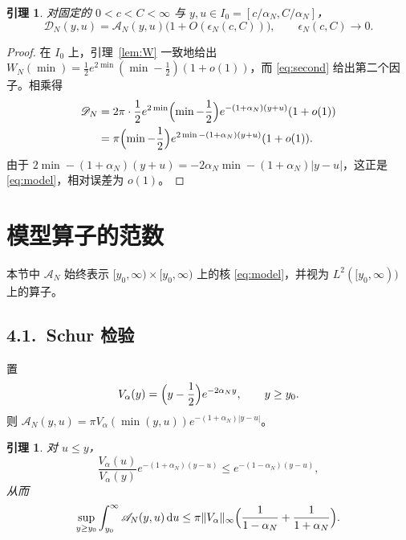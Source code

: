 \documentclass[12pt,a4paper]{amsart}
\numberwithin{equation}{section}
\theoremstyle{plain}
\newtheorem{lemma}[theorem]{引理}
\theoremstyle{definition}
\newcommand{\dd}{\,\mathrm{d}}
\begin{document}
\begin{lemma}\label{lem:close}
对固定的 $0<c<C<\infty$ 与 $y,u\in I_0=[c/\alpha_N,C/\alpha_N]$，
\begin{equation}\label{eq:close}
 \mathscr D_N(y,u)=\mathscr A_N(y,u)\bigl(1+O(\epsilon_N(c,C))\bigr),
 \qquad \epsilon_N(c,C)\longrightarrow0 .
\end{equation}
\end{lemma}

\begin{proof}
在 $I_0$ 上，引理~\ref{lem:W} 一致地给出
$W_N(\min)=\frac12e^{2\min}(\min-\frac12)(1+o(1))$，而 \eqref{eq:second}
给出第二个因子。相乘得
\[
 \begin{aligned}
 \mathscr D_N
 &=2\pi\cdot\frac12 e^{2\min}\Bigl(\min-\frac12\Bigr)e^{-(1+\alpha_N)(y+u)}(1+o(1))\\
 &=\pi\Bigl(\min-\frac12\Bigr)e^{2\min-(1+\alpha_N)(y+u)}(1+o(1)).
 \end{aligned}
\]
由于 $2\min-(1+\alpha_N)(y+u)=-2\alpha_N\min-(1+\alpha_N)|y-u|$，这正是
\eqref{eq:model}，相对误差为 $o(1)$。
\end{proof}

\section{模型算子的范数}\label{sec:model}

本节中 $\mathscr A_N$ 始终表示 $[y_0,\infty)\times[y_0,\infty)$ 上的核
\eqref{eq:model}，并视为 $L^2([y_0,\infty))$ 上的算子。

\subsection*{4.1.\ Schur 检验}

置
\begin{equation}\label{eq:Valpha}
 V_\alpha(y)=\Bigl(y-\frac12\Bigr)e^{-2\alpha_Ny},\qquad y\ge y_0 .
\end{equation}
则 $\mathscr A_N(y,u)=\pi V_\alpha(\min(y,u))e^{-(1+\alpha_N)|y-u|}$。

\begin{lemma}\label{lem:schur}
对 $u\le y$，
\begin{equation}\label{eq:ratio}
 \frac{V_\alpha(u)}{V_\alpha(y)}e^{-(1+\alpha_N)(y-u)}
 \le e^{-(1-\alpha_N)(y-u)},
\end{equation}
从而
\begin{equation}\label{eq:schur}
 \sup_{y\ge y_0}\int_{y_0}^{\infty}\mathscr A_N(y,u)\dd u
 \le\pi\|V_\alpha\|_\infty
 \Bigl(\frac1{1-\alpha_N}+\frac1{1+\alpha_N}\Bigr).
\end{equation}
\end{lemma}
\end{document}
